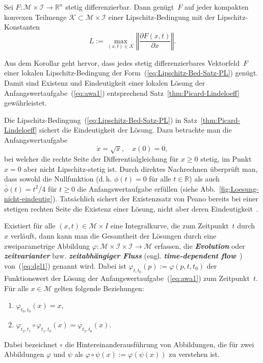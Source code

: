 \begin{corollary}
\label{cor:Lipschitz-Mittelwertsatz}Sei
$F:\mathcal{M}\times\mathcal{I}\to{\mathbb{R}}^{n}$ stetig differenzierbar.
Dann genügt~$F$ auf jeder kompakten konvexen Teilmenge $\mathcal{K}\subset\mathcal{M}\times\mathcal{I}$
einer Lipschitz-Bedingung mit der Lipschitz-Konstanten
\[
L:=\max\limits _{(x,t)\in\mathcal{K}}\left\Vert \frac{\partial F(x,t)}{\partial x}\right\Vert .
\]
\end{corollary}

Aus dem Korollar geht hervor, dass jedes stetig differenzierbares
Vektorfeld~$F$ einer lokalen Lipschitz-Bedingung der Form~(\ref{eq:Lipschitz-Bed-Satz-PL})
genügt. Damit sind Existenz und Eindeutigkeit einer lokalen Lösung
der Anfangswertaufgabe~(\ref{eq:awa1}) entsprechend Satz~\ref{thm:Picard-Lindeloeff}
gewährleistet.

\begin{remark}
\label{rem:Nicht-Lipschitz-Peano}Die Lipschitz-Bedingung~(\ref{eq:Lipschitz-Bed-Satz-PL})
in Satz~\ref{thm:Picard-Lindeloeff} sichert die Eindeutigkeit der
Lösung. Dazu betrachte man die Anfangswertaufgabe
\begin{equation}
\dot{x}=\sqrt{x},\quad x(0)=0,\label{eq:awa-nicht-eindeutig}
\end{equation}
bei welcher die rechte Seite der Differentialgleichung für $x\geq0$
stetig, im Punkt $x=0$ aber nicht Lipschitz-stetig
ist. Durch direktes Nachrechnen überprüft man, dass sowohl die Nullfunktion
(d.\,h. $\phi(t)=0$ für alle $t\in{\mathbb{R}}$) als auch $\bar{\phi}(t)=t^{2}/4$
für $t\geq0$ die Anfangswertaufgabe erfüllen (siehe Abb.~\ref{fig:Loesung-nicht-eindeutig}).
Tatsächlich sichert der Existenzsatz von Peano
bereits bei einer stetigen rechten Seite die Existenz einer Lösung,
nicht aber deren Eindeutigkeit~\cite{amann1995}.
\end{remark}


Existiert für alle $(x,t)\in\mathcal{M}\times I$ eine Integralkurve,
die zum Zeitpunkt~$t$ durch~$x$ verläuft, dann kann man die Gesamtheit
der Lösungen durch eine zweiparametrige Abbildung $\varphi:\mathcal{M}\times\mathcal{I}\times\mathcal{I}\to\mathcal{M}$
erfassen, die \textbf{\em Evolution} oder \textbf{\em zeitvarianter }bzw. \textbf{\em zeitabhängiger
Fluss} (engl. \textbf{\em time-dependent flow}~\cite{bloch2003})
von~(\ref{eq:dgl1}) genannt wird. Dabei ist $\varphi_{t,t_{0}}(p):=\varphi(p,t,t_{0})$
der Funktionswert der Lösung der Anfangswertaufgabe~(\ref{eq:awa1})
zum Zeitpunkt~$t$. Für alle $x\in\mathcal{M}$ gelten folgende Beziehungen:
\begin{enumerate}
\item $\varphi_{t_{0},t_{0}}(x)=x$,
\item $\varphi_{t_{2},t_{1}}\circ\varphi_{t_{1},t_{0}}(x)=\varphi_{t_{2},t_{0}}(x)$.
\end{enumerate}
Dabei bezeichnet $\circ$ die Hintereinanderausführung von Abbildungen,
die für zwei Abbildungen $\varphi$ und $\psi$ als $\varphi\circ\psi(x):=\varphi(\psi(x))$
zu verstehen ist.

